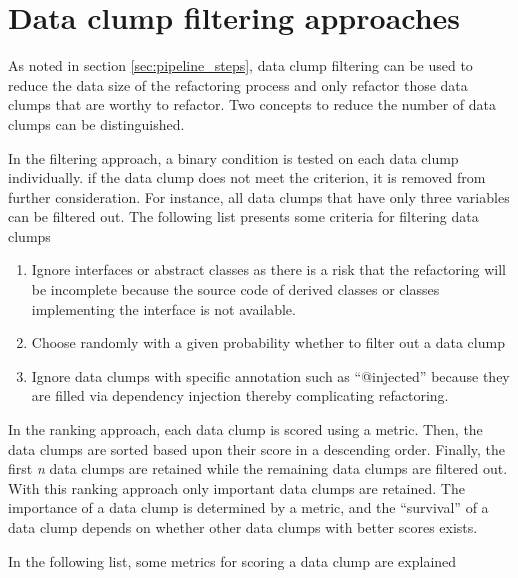 \section{Data clump filtering approaches}
\label{sec:data_clump_filtering}

As noted in section \ref{sec:pipeline_steps}, data clump filtering can be used to reduce the data size of the refactoring process and only refactor those data clumps that are worthy to refactor. Two concepts to  reduce the number of data clumps can be distinguished.

In the filtering approach, a binary condition is tested on each data clump individually. if the data clump does not meet the criterion, it is removed from further consideration. For instance, all data clumps that have only three variables can be filtered out. 
The following list presents some criteria for filtering data clumps
\begin{enumerate}
    \item Ignore interfaces or abstract classes as there is a risk that the refactoring will be incomplete because the source code of derived classes or classes implementing the interface is not available. 

    \item Choose randomly with a given probability whether to filter out a data clump
    \item Ignore data clumps with specific annotation such as \enquote{@injected} because they are filled via dependency injection thereby complicating refactoring.
 
\end{enumerate}

In the ranking approach, each data clump is scored using a metric. Then, the data clumps are sorted based upon their score in a descending order. Finally, the first  \textit{n} data clumps are retained while the remaining data clumps are filtered out. With this ranking approach only important data clumps are retained. The importance of a data clump is determined by a metric, and the \enquote{survival} of a data clump depends on whether other data clumps with better scores exists.

In the following list, some metrics for scoring a data clump are explained

